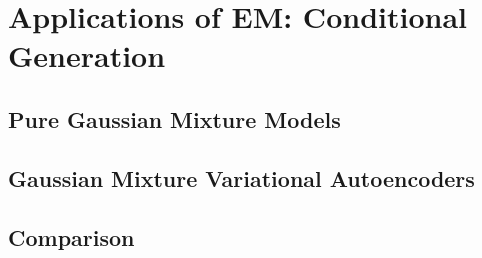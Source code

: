 \section{Applications of EM: Conditional Generation}
\subsection{Pure Gaussian Mixture Models}
\subsection{Gaussian Mixture Variational Autoencoders}
\subsection{Comparison}